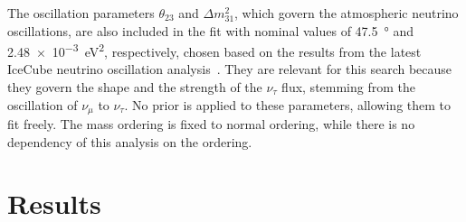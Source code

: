 \documentclass[
    aps,
    prd,
    reprint,
    amsmath,
    amssymb,
    nofootinbib,
    linenumbers,
    superscriptaddress,
    floatfix
]{revtex4-2}
\begin{document}
The oscillation parameters $\theta_{23}$ and $\Delta m^{2}_{31}$, which govern the atmospheric neutrino oscillations, are also included in the fit with nominal values of \SI{47.5}{\degree} and \SI{2.48e-3}{\electronvolt^2}, respectively, chosen based on the results from the latest IceCube neutrino oscillation analysis~\cite{IceCube:2024xjj}.
They are relevant for this search because they govern the shape and the strength of the $\nu_\tau$ flux, stemming from the oscillation of $\nu_\mu$ to $\nu_\tau$.
No prior is applied to these parameters, allowing them to fit freely.
The mass ordering is fixed to normal ordering, while there is no dependency of this analysis on the ordering.




\section{\label{sec:results}Results}
\end{document}
